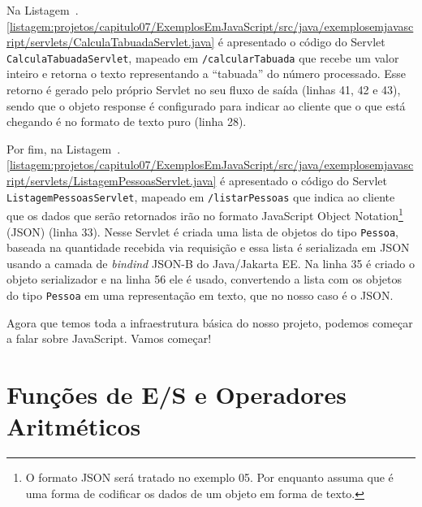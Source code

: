 Na Listagem~\thechapter.\ref{listagem:projetos/capitulo07/ExemplosEmJavaScript/src/java/exemplosemjavascript/servlets/CalculaTabuadaServlet.java} é apresentado o código do Servlet \texttt{CalculaTabuadaServlet}, mapeado em \texttt{/calcularTabuada} que recebe um valor inteiro e retorna o texto representando a ``tabuada'' do número processado. Esse retorno é gerado pelo próprio Servlet no seu fluxo de saída (linhas 41, 42 e 43), sendo que o objeto response é configurado para indicar ao cliente que o que está chegando é no formato de texto puro (linha 28).


Por fim, na Listagem~\thechapter.\ref{listagem:projetos/capitulo07/ExemplosEmJavaScript/src/java/exemplosemjavascript/servlets/ListagemPessoasServlet.java} é apresentado o código do Servlet \texttt{ListagemPessoasServlet}, mapeado em \texttt{/listarPessoas} que indica ao cliente que os dados que serão retornados irão no formato JavaScript Object Notation\footnote{O formato JSON será tratado no exemplo 05. Por enquanto assuma que é uma forma de codificar os dados de um objeto em forma de texto.} (JSON) (linha 33). Nesse Servlet é criada uma lista de objetos do tipo \texttt{Pessoa}, baseada na quantidade recebida via requisição e essa lista é serializada em JSON usando a camada de \textit{bindind} JSON-B do Java/Jakarta EE. Na linha 35 é criado o objeto serializador e na linha 56 ele é usado, convertendo a lista com os objetos do tipo \texttt{Pessoa} em uma representação em texto, que no nosso caso é o JSON.


Agora que temos toda a infraestrutura básica do nosso projeto, podemos começar a falar sobre JavaScript. Vamos começar!



\section{Funções de E/S e Operadores Aritméticos}

